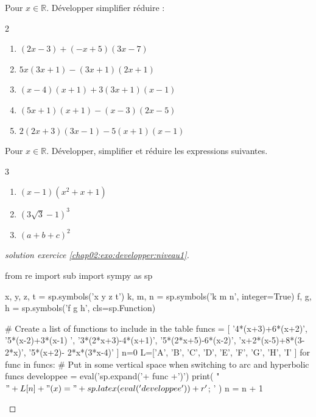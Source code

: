 \begin{exercise} \label{chap02:exo:developper:niveau3} Pour $x\in\mathbb{R}$. Développer simplifier réduire :
	\begin{multicols}{2} 
		\begin{enumerate}[label={$\Alph*(x)=$},leftmargin=*]
			\item $(2x-3)+ (-x+5)(3x-7)$  
			\item $5x(3x+1)-(3x+1)(2x+1)$
			\item $(x -4)(x+1) +3(3x +1)(x -1)$  
			\item $(5x+1)(x+1)- (x-3)(2x-5)$   
			\item $2(2x+3)(3x-1)-5(x+1)(x-1)$  
		\end{enumerate}
	\end{multicols}
\end{exercise}
\begin{exercise} \label{chap02:exo:developper:niveau4} Pour $x\in\mathbb{R}$.
	Développer, simplifier et réduire les expressions suivantes.
\begin{multicols}{3}
	\begin{enumerate}[label={$\Alph*(x)=$},leftmargin=*]
		\item $(x-1)(x^2+x+1)$  
		\item $(3\sqrt{3}-1)^3$ 
		\item $(a+b+c)^2$
	\end{enumerate}
\end{multicols}
 \end{exercise}
\begin{proof}[solution exercice \ref{chap02:exo:developper:niveau1}] 
\begin{pycode}
from re import sub
import sympy as sp

x, y, z, t = sp.symbols('x y z t')
k, m, n = sp.symbols('k m n', integer=True)
f, g, h = sp.symbols('f g h', cls=sp.Function)

# Create a list of functions to include in the table
funcs = [ '4*(x+3)+6*(x+2)',
'5*(x-2)+3*(x-1) ',
'3*(2*x+3)-4*(x+1)',
'5*(2*x+5)-6*(x-2)',
'x+2*(x-5)+8*(3-2*x)',
'5*(x+2)- 2*x*(3*x-4)'
]
n=0
L=['A', 'B', 'C', 'D', 'E', 'F', 'G', 'H', 'I'  ]
for func in funcs:
	# Put in some vertical space when switching to arc and hyperbolic funcs 
	developpee =  eval('sp.expand('+ func +')') 
	print( "$"+L[n] + "(x) =" + sp.latex( eval('developpee') )  + r'$; ' ) 
	n     = n + 1 
\end{pycode}
\end{proof} 

